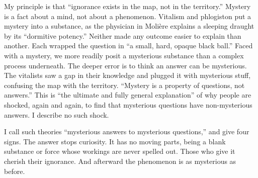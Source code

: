 My principle is that ``ignorance exists in the map, not in the territory.'' Mystery is a fact about a mind, not about a phenomenon.  Vitalism and phlogiston put a mystery into a substance, as the physician in Molière explains a sleeping draught by its ``dormitive potency.'' Neither made any outcome easier to explain than another. Each wrapped the question in ``a small, hard, opaque black ball.'' Faced with a mystery, we more readily posit a mysterious substance than a complex process underneath. The deeper error is to think an answer can be mysterious. The vitalists saw a gap in their knowledge and plugged it with mysterious stuff, confusing the map with the territory. ``Mystery is a property of questions, not answers.'' This is ``the ultimate and fully general explanation'' of why people are shocked, again and again, to find that mysterious questions have non-mysterious answers. I describe no such shock.

I call such theories ``mysterious answers to mysterious questions,'' and give four signs. The answer stops curiosity. It has no moving parts, being a blank substance or force whose workings are never spelled out. Those who give it cherish their ignorance. And afterward the phenomenon is as mysterious as before.
